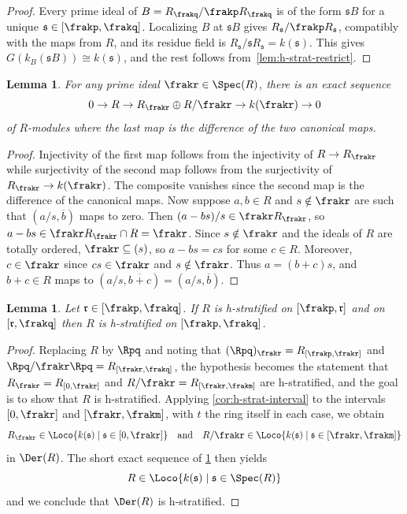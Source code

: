 \documentclass{amsart}
\numberwithin{equation}{section}%
\newtheorem{Lem}[equation]{Lemma}
\theoremstyle{remark}
\begin{document}
\begin{proof}
	Every prime ideal of $B = R_\frakq/\frakp R_\frakq$ is of the form $\mathfrak{s}B$ for a unique $\mathfrak{s} \in [\frakp,\frakq]$. Localizing $B$ at $\mathfrak{s}B$ gives $R_{\mathfrak{s}}/\frakp R_{\mathfrak{s}}$, compatibly with the maps from $R$, and its residue field is $R_{\mathfrak{s}}/\mathfrak{s}R_{\mathfrak{s}} = k(\mathfrak{s})$. This gives $G(k_B(\mathfrak{s}B)) \cong k(\mathfrak{s})$, and the rest follows from~\cref{lem:h-strat-restrict}.
\end{proof}

\begin{Lem}\label{lem:SES}
	For any prime ideal $\frakr \in \Spec(R)$, there is an exact sequence
	\[
		0 \to R \to R_\frakr \oplus R/\frakr \to k(\frakr) \to 0
	\]
	of $R$-modules where the last map is the difference of the two canonical maps.
\end{Lem}

\begin{proof}
	Injectivity of the first map follows from the injectivity of $R \to R_\frakr$ while surjectivity of the second map follows from the surjectivity of $R_\frakr \to k(\frakr)$. The composite vanishes since the second map is the difference of the canonical maps. Now suppose $a,b \in R$ and $s \notin \frakr$ are such that $(a/s,\overbar{b})$ maps to zero. Then $(a-bs)/s \in \frakr R_\frakr$, so $a - bs \in \frakr R_\frakr \cap R = \frakr$. Since $s \notin \frakr$ and the ideals of $R$ are totally ordered, $\frakr \subseteq (s)$, so $a - bs = cs$ for some $c \in R$. Moreover, $c \in \frakr$ since $cs \in \frakr$ and $s \notin \frakr$. Thus $a = (b+c)s$, and $b + c \in R$ maps to $(a/s, \overbar{b+c}) = (a/s, \overbar{b})$.
\end{proof}

\begin{Lem}\label{lem:glue}
	Let $\mathfrak{r} \in [\frakp,\frakq]$. If $R$ is h-stratified on $[\frakp,\mathfrak{r}]$ and on $[\mathfrak{r},\frakq]$ then $R$ is h-stratified on $[\frakp,\frakq]$.
\end{Lem}

\begin{proof}
	Replacing $R$ by $\Rpq$ and noting that $(\Rpq)_{\frakr} = R_{[\frakp,\frakr]}$ and $\Rpq/\frakr\Rpq = R_{[\frakr,\frakq]}$, the hypothesis becomes the statement that $R_\frakr = R_{[0,\frakr]}$ and $R/\frakr = R_{[\frakr,\frakm]}$ are h-stratified, and the goal is to show that $R$ is h-stratified. Applying \cref{cor:h-strat-interval} to the intervals $[0,\frakr]$ and $[\frakr,\frakm]$, with $t$ the ring itself in each case, we obtain
	\[
		R_\frakr \in \Loco{k(\mathfrak{s}) \mid \mathfrak{s} \in [0,\frakr]} \quad\text{and}\quad R/\frakr \in \Loco{k(\mathfrak{s}) \mid \mathfrak{s} \in [\frakr,\frakm]}
	\]
	in $\Der(R)$. The short exact sequence of \cref{lem:SES} then yields
	\[
		R \in \Loco{k(\mathfrak{s}) \mid \mathfrak{s} \in \Spec(R)}
	\]
	and we conclude that $\Der(R)$ is h-stratified.
\end{proof}
\end{document}

